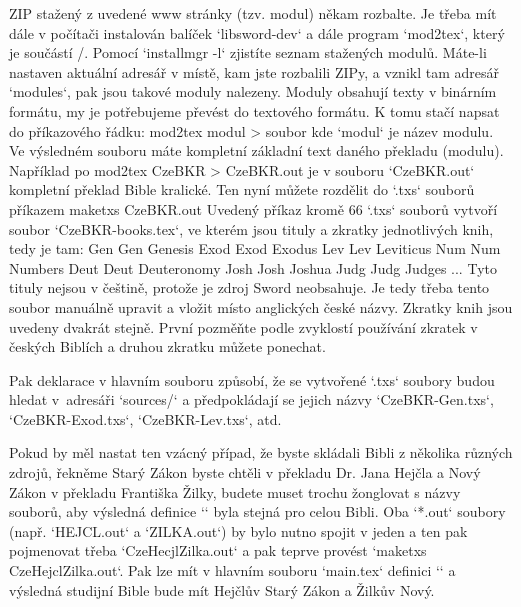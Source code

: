 ZIP stažený z uvedené www stránky (tzv. modul) někam rozbalte. Je třeba
mít dále v počítači instalován balíček `libsword-dev` a dále program
`mod2tex`, který je součástí \OpBible/. Pomocí `installmgr -l` zjistíte
seznam stažených modulů. Máte-li nastaven aktuální adresář v místě, kam jste
rozbalili ZIPy, a vznikl tam adresář `modules`, pak jsou takové moduly
nalezeny. Moduly obsahují texty v binárním formátu, my je potřebujeme
převést do textového formátu. K tomu stačí napsat do příkazového řádku: 
\begtt 
mod2tex modul > soubor
\endtt 
kde `modul` je název modulu. Ve výsledném souboru
máte kompletní základní text daného překladu (modulu).
Například po
\begtt
mod2tex CzeBKR > CzeBKR.out
\endtt
je v souboru `CzeBKR.out` kompletní překlad Bible kralické.
Ten nyní můžete rozdělit do `.txs` souborů příkazem
\begtt
maketxs CzeBKR.out
\endtt
Uvedený příkaz kromě 66 `.txs` souborů vytvoří soubor `CzeBKR-books.tex`, ve
kterém jsou tituly a zkratky jednotlivých knih, tedy je tam:
\begtt
\BookTitle Gen Gen {Genesis}
\BookTitle Exod Exod {Exodus}
\BookTitle Lev Lev {Leviticus}
\BookTitle Num Num {Numbers}
\BookTitle Deut Deut {Deuteronomy}
\BookTitle Josh Josh {Joshua}
\BookTitle Judg Judg {Judges}
...
\endtt
Tyto tituly nejsou v češtině, protože je zdroj Sword neobsahuje. Je tedy
třeba tento soubor manuálně upravit a vložit místo anglických české názvy.
Zkratky knih jsou uvedeny dvakrát stejně. První pozměňte podle zvyklostí
používání zkratek v českých Biblích a druhou zkratku můžete ponechat.

Pak deklarace 
\begtt
\def\txsfile  {sources/Cze\tmark-\bmark.txs}
\endtt
v hlavním souboru způsobí, že se vytvořené `.txs` soubory budou hledat 
v~adresáři `sources/` a předpokládají se jejich názvy
`CzeBKR-Gen.txs`, `CzeBKR-Exod.txs`, `CzeBKR-Lev.txs`, atd.

Pokud by měl nastat ten vzácný případ, že byste skládali Bibli z několika různých zdrojů, řekněme Starý Zákon byste chtěli v překladu Dr. Jana Hejčla a Nový Zákon v překladu Františka Žilky, budete muset trochu žonglovat s názvy souborů, aby výsledná definice `\tmark` byla stejná pro celou Bibli. Oba `*.out` soubory (např. `HEJCL.out` a `ZILKA.out`) by bylo nutno spojit v jeden a ten pak pojmenovat třeba `CzeHecjlZilka.out` a pak teprve provést 
`maketxs CzeHejclZilka.out`.  Pak lze mít v hlavním souboru `main.tex` definici    `\def\tmark{HejclZilka}` a 
výsledná studijní Bible bude mít Hejčlův Starý Zákon a Žilkův Nový.


